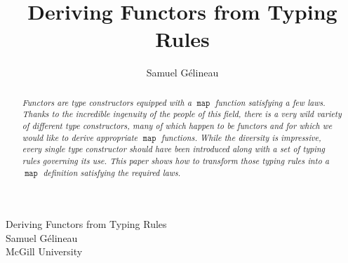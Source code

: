 \documentclass[proof]{article}
\title{Deriving Functors from Typing Rules}
\author{Samuel G\'elineau}
\newcommand{\map}{\ensuremath{\mathop{\mathtt{map}}}}
\begin{document}
\begin{center}
{\larger[3] Deriving Functors from Typing Rules}\\
\vspace{\bigskipamount}
{\larger Samuel G\'elineau}\\
McGill University
\end{center}

\begin{abstract}\em
Functors are type constructors equipped with a $\map$ function satisfying a few laws. Thanks to the incredible ingenuity of the people of this field, there is a very wild variety of different type constructors, many of which happen to be functors and for which we would like to derive appropriate $\map$ functions. While the diversity is impressive, every single type constructor should have been introduced along with a set of typing rules governing its use. This paper shows how to transform those typing rules into a $\map$ definition satisfying the required laws.
\end{abstract}
\end{document}
